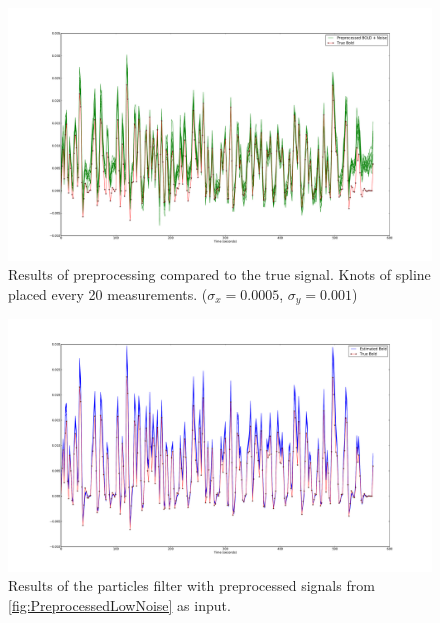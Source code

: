 \begin{figure}
\centering
\includegraphics[clip=true,trim=6cm 2cm 5cm 3.5cm,width=15cm]{images/preprocessed_lownoise}
\caption[Results of preprocessing compared to the true signal.]
{Results of preprocessing compared to the true signal. 
 Knots of spline placed every 20 measurements.
 ($\sigma_x = 0.0005$, $\sigma_y = 0.001$)}
\label{fig:PreprocessedLowNoise}
\end{figure}

\begin{figure}
\centering
\includegraphics[clip=true,trim=6cm 2cm 5cm 3.5cm,width=15cm]{images/comparison_lownoise}
\caption{Results of the particles filter with preprocessed signals from \autoref{fig:PreprocessedLowNoise}
as input.}
\label{fig:FitComparisonLowNoise}
\end{figure}

